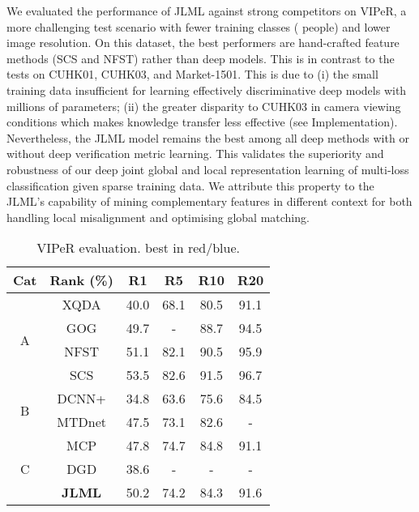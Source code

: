 \documentclass{article}
\begin{document}
\vspace{0.1cm}
We evaluated the performance of JLML against  strong competitors on VIPeR,
a more challenging test scenario with fewer training
classes ( people) and lower image resolution.
On this dataset, the best performers are 
hand-crafted feature methods (SCS and NFST)
rather than deep models. This is in contrast to the tests on CUHK01,
CUHK03, and Market-1501. 
This is due to (i) the small training data insufficient for learning
effectively discriminative deep models with millions of parameters;
(ii) the greater disparity to CUHK03 in camera viewing conditions
which makes knowledge transfer less effective (see Implementation).
Nevertheless, the JLML model remains the best among all deep
methods with or without deep verification metric learning.
This validates the superiority and robustness of our deep joint global
and local representation learning of multi-loss classification
given sparse training data.
We attribute this property to the JLML's capability of 
mining complementary features in different context for both 
handling local misalignment and optimising global matching.

\begin{table} [!h]
	\centering
	\footnotesize
	\renewcommand{\arraystretch}{1}
	\setlength{\tabcolsep}{0.35 cm}
	\vspace{-.3cm}
	\caption{\footnotesize
		VIPeR evaluation.  best in red/blue.
	}
	\vskip 0pt \begin{tabular}{|c||c|cccc|}
		\hline
\multirow{1}{*}{Cat}
		& Rank (\%) & R1 & R5 & R10 & R20 \\ \hline \hline
		\multirow{4}{*}{A}
		& XQDA 	& 40.0  & 68.1  &  80.5 &  91.1 \\   & GOG 	& 49.7  & -  &  88.7 &  94.5 \\  & NFST 	&  \color{blue}  51.1  &  \color{blue}  82.1  &  \color{blue}  90.5 &  \color{blue}  95.9 \\
		& SCS 	& \color{red} 53.5  & \color{red} 82.6  & \color{red} 91.5 & \color{red} 96.7 \\ 
		\hline
		\multirow{2}{*}{B}
		& DCNN+ & 34.8  & 63.6  &  75.6 &  84.5 \\  & MTDnet & 47.5 & 73.1 & 82.6 & - \\
		\hline
		\multirow{3}{*}{C}
		& MCP & 47.8  & 74.7  & 84.8 &  91.1 \\
& DGD & 38.6  & -  &  - &  -\\ 
		& {\bf JLML}  & 50.2  & 74.2 & 84.3 & 91.6 \\
\hline
	\end{tabular}\label{tab:res_viper}
	\vspace{-.3cm}
\end{table}
\end{document}
